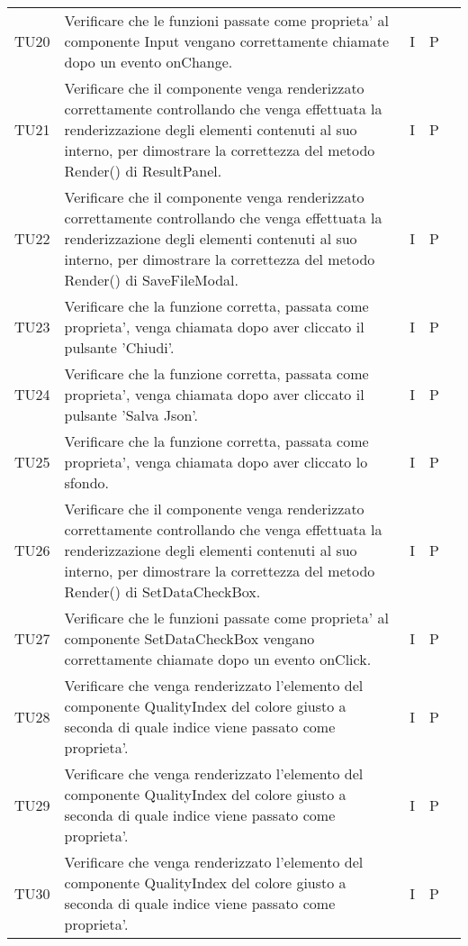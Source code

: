 \begin{longtable} {
		>{}p{15mm} 
		>{}p{79.5mm}
		>{}p{15mm} 
		>{}p{15mm}
		>{}p{0mm}}
	TU20		& Verificare che le funzioni passate come proprieta' al componente Input vengano correttamente chiamate dopo un evento onChange.& I & P &\TBstrut \\ [2mm]
	TU21		& Verificare che il componente venga renderizzato correttamente controllando che venga effettuata la renderizzazione degli elementi contenuti al suo interno, per dimostrare la correttezza del metodo Render() di ResultPanel.& I & P &\TBstrut \\ [2mm]	
	TU22		& Verificare che il componente venga renderizzato correttamente controllando che venga effettuata la renderizzazione degli elementi contenuti al suo interno, per dimostrare la correttezza del metodo Render() di  SaveFileModal.& I & P &\TBstrut \\ [2mm]
	TU23		& Verificare che la funzione corretta, passata come proprieta', venga chiamata dopo aver cliccato il pulsante 'Chiudi'.& I & P &\TBstrut \\ [2mm]
	TU24		& Verificare che la funzione corretta, passata come proprieta', venga chiamata dopo aver cliccato il pulsante 'Salva Json'.& I & P &\TBstrut \\ [2mm]
	TU25		& Verificare che la funzione corretta, passata come proprieta', venga chiamata dopo aver cliccato lo sfondo.& I & P &\TBstrut \\ [2mm]
	TU26		& Verificare che il componente venga renderizzato correttamente controllando che venga effettuata la renderizzazione degli elementi contenuti al suo interno, per dimostrare la correttezza del metodo Render() di  SetDataCheckBox.& I & P &\TBstrut \\ [2mm]
	TU27		& Verificare che le funzioni passate come proprieta' al componente SetDataCheckBox vengano correttamente chiamate dopo un evento onClick.& I & P &\TBstrut \\ [2mm]		
	TU28		& Verificare che venga renderizzato l'elemento del componente QualityIndex del colore giusto a seconda di quale indice viene passato come proprieta'.& I & P &\TBstrut \\ [2mm]
	TU29		& Verificare che venga renderizzato l'elemento del componente QualityIndex del colore giusto a seconda di quale indice viene passato come proprieta'.& I & P &\TBstrut \\ [2mm]
	TU30		& Verificare che venga renderizzato l'elemento del componente QualityIndex del colore giusto a seconda di quale indice viene passato come proprieta'.& I & P &\TBstrut \\ [2mm]

\end{longtable}
